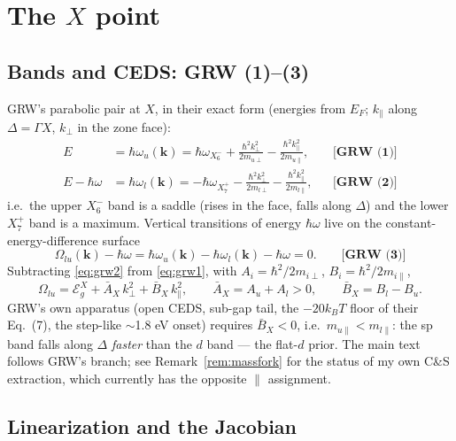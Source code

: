 \documentclass[11pt,a4paper]{article}
\numberwithin{equation}{section}
\newcommand{\hw}{\hbar\omega}
\newcommand{\EgX}{\mathcal{E}_g^{X}}
\newcommand{\AX}{\bar{A}_X}
\newcommand{\BX}{\bar{B}_X}
\newcommand{\kperp}{k_{\perp}}
\newcommand{\kpar}{k_{\parallel}}
\newcommand{\wXsix}{\hbar\omega_{X_6^-}}
\newcommand{\wXseven}{\hbar\omega_{X_7^+}}
\newcommand{\grweq}[1]{\textbf{[GRW~(#1)]}}
\begin{document}
\section{The $X$ point}\label{sec:X}

\subsection{Bands and CEDS: GRW (1)--(3)}

GRW's parabolic pair at $X$, in their exact form (energies from
$E_F$; $\kpar$ along $\Delta=\Gamma X$, $\kperp$ in the zone face):
\begin{align}
E&=\hbar\omega_u(\mathbf k)
=\wXsix+\frac{\hbar^2\kperp^2}{2m_{u\perp}}
        -\frac{\hbar^2\kpar^2}{2m_{u\parallel}},
&&\grweq{1}
\label{eq:grw1}\\[2pt]
E-\hw&=\hbar\omega_l(\mathbf k)
=-\wXseven-\frac{\hbar^2\kperp^2}{2m_{l\perp}}
          -\frac{\hbar^2\kpar^2}{2m_{l\parallel}},
&&\grweq{2}
\label{eq:grw2}
\end{align}
i.e.\ the upper $X_6^-$ band is a saddle (rises in the face, falls
along $\Delta$) and the lower $X_7^+$ band is a maximum.  Vertical
transitions of energy $\hw$ live on the constant-energy-difference
surface
\begin{equation}
\Omega_{lu}(\mathbf k)-\hw=
\hbar\omega_u(\mathbf k)-\hbar\omega_l(\mathbf k)-\hw=0 .
\qquad\grweq{3}
\label{eq:grw3}
\end{equation}
Subtracting \eqref{eq:grw2} from \eqref{eq:grw1}, with
$A_i=\hbar^2/2m_{i\perp}$, $B_i=\hbar^2/2m_{i\parallel}$,
\begin{equation}
\Omega_{lu}=\EgX+\AX\,\kperp^2+\BX\,\kpar^2,
\qquad
\AX=A_u+A_l>0,\qquad
\BX=B_l-B_u .
\label{eq:OmegaX}
\end{equation}
GRW's own apparatus (open CEDS, sub-gap tail, the $-20k_BT$ floor of
their Eq.~(7), the step-like $\sim$1.8 eV onset) requires
$\boxed{\BX<0}$, i.e.\ $m_{u\parallel}<m_{l\parallel}$: the sp band
falls along $\Delta$ \emph{faster} than the $d$ band --- the flat-$d$
prior.  The main text follows GRW's branch; see
Remark~\ref{rem:massfork} for the status of my own C\&S extraction,
which currently has the opposite $\parallel$ assignment.

\subsection{Linearization and the Jacobian}
\end{document}
